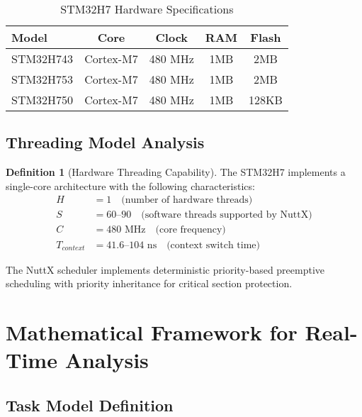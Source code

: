 \documentclass[11pt,a4paper]{article}
\theoremstyle{definition}
\newtheorem{definition}[theorem]{Definition}
\theoremstyle{remark}
\begin{document}
\begin{table}[h]
\centering
\caption{STM32H7 Hardware Specifications}
\label{tab:stm32h7_specs}
\begin{tabular}{lcccc}
\toprule
\textbf{Model} & \textbf{Core} & \textbf{Clock} & \textbf{RAM} & \textbf{Flash} \\
\midrule
STM32H743 & Cortex-M7 & 480 MHz & 1MB & 2MB \\
STM32H753 & Cortex-M7 & 480 MHz & 1MB & 2MB \\
STM32H750 & Cortex-M7 & 480 MHz & 1MB & 128KB \\
\bottomrule
\end{tabular}
\end{table}

\subsection{Threading Model Analysis}

\begin{definition}[Hardware Threading Capability]
The STM32H7 implements a single-core architecture with the following characteristics:
\begin{align}
H &= 1 \quad \text{(number of hardware threads)} \\
S &= 60\text{--}90 \quad \text{(software threads supported by NuttX)} \\
C &= 480 \text{ MHz} \quad \text{(core frequency)} \\
T_{context} &= 41.6\text{--}104 \text{ ns} \quad \text{(context switch time)}
\end{align}
\end{definition}

The NuttX scheduler implements deterministic priority-based preemptive scheduling with priority inheritance for critical section protection.

\section{Mathematical Framework for Real-Time Analysis}

\subsection{Task Model Definition}
\end{document}

